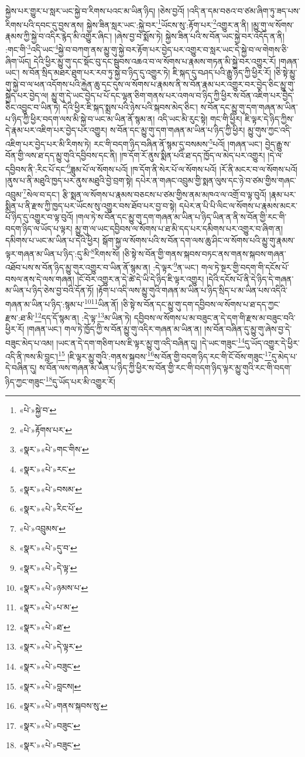 སྐྱེས་པར་གྱུར་པ་སླར་ཡང་སྐྱེ་བ་རིགས་པའང་མ་ཡིན་ཉིད། །ཅེས་བྱའོ། །འདི་ན་དམ་བཅའ་བ་ཙམ་ཞིག་ཏུ་ཟད་པས་རིགས་པའི་དབང་དུ་བྱས་ནས། སྐྱེས་ཟིན་སླར་ཡང་:སྐྱེ་བར་\footnote{«པེ་»སྐྱེ་བ་}ཡོངས་སུ་:རྟོག་པར་\footnote{«པེ་»རྟོགས་པར་}འགྱུར་ན་ནི། །མྱུ་གུ་ལ་སོགས་རྣམས་ཀྱི་སྐྱེ་བ་འདིར་རྙེད་མི་འགྱུར་ཞིང་། །ཞེས་བྱ་བ་སྨོས་ཏེ། སྐྱེས་ཟིན་པའི་ས་བོན་ཡང་སྐྱེ་བར་འདོད་ན་ནི། :གང་གི་\footnote{«སྣར་»«པེ་»གང་གིས་}འདི་ཡང་\footnote{«སྣར་»«པེ་»རང་}སྐྱེ་བ་བཀག་ནས་མྱུ་གུ་སྐྱེ་བར་རྟོག་པར་བྱེད་པར་འགྱུར་བ་སླར་ཡང་དེ་སྐྱེ་བ་ལ་གེགས་ཅི་ཞིག་ཡོད། དེའི་ཕྱིར་མྱུ་གུ་དང་སྡོང་བུ་དང་སྦུབས་འཆའ་བ་ལ་སོགས་པ་རྣམས་གཏན་མི་སྐྱེ་བར་འགྱུར་རོ། །གཞན་ཡང་། ས་བོན་སྲིད་མཐར་ཐུག་པར་རབ་ཏུ་སྐྱེ་བ་ཉིད་དུ་འགྱུར་ཏེ། ཇི་སྐད་དུ་བཤད་པའི་རྒྱུ་ཉིད་ཀྱི་ཕྱིར་རོ། །ཅི་སྟེ་མྱུ་གུ་སྐྱེ་བ་ལ་ཕན་འདོགས་པའི་རྐྱེན་ཆུ་དང་དུས་ལ་སོགས་པ་རྣམས་ནི་ས་བོན་རྣམ་པར་འགྱུར་བར་བྱེད་ཅིང་མྱུ་གུ་སྐྱེད་པར་བྱེད་ལ། མྱུ་གུ་དེ་ཡང་བྱེད་པ་པོ་དང་ལྷན་ཅིག་གནས་པར་འགལ་བ་ཉིད་ཀྱི་ཕྱིར་ས་བོན་འཇིག་པར་བྱེད་ཅིང་འབྱུང་བ་ཡིན་ཏེ། དེའི་ཕྱིར་ཇི་སྐད་སྨྲས་པའི་ཉེས་པའི་སྐབས་མེད་ཅིང་། ས་བོན་དང་མྱུ་གུ་དག་གཞན་མ་ཡིན་པ་ཉིད་ཀྱི་ཕྱིར་བདག་ལས་མི་སྐྱེ་བ་ཡང་མ་ཡིན་ནོ་སྙམ་ན། འདི་ཡང་མི་རུང་སྟེ། གང་གི་ཕྱིར། ཇི་ལྟར་དེ་ཉིད་ཀྱིས་དེ་རྣམ་པར་འཇིག་པར་བྱེད་པར་འགྱུར། ས་བོན་དང་མྱུ་གུ་དག་གཞན་མ་ཡིན་པ་ཉིད་ཀྱི་ཕྱིར། མྱུ་གུས་ཀྱང་འདི་འཇིག་པར་བྱེད་པར་མི་རིགས་ཏེ། རང་གི་བདག་ཉིད་བཞིན་ནོ་སྙམ་དུ་བསམས་\footnote{«སྣར་»«པེ་»བསམ་}པའོ། །གཞན་ཡང་། བྱེད་རྒྱུ་ས་བོན་གྱི་ལས་ཐ་དད་མྱུ་གུའི་དབྱིབས་དང་ནི། །ཁ་དོག་རོ་ནུས་སྨིན་པའི་ཐ་དད་ཁྱོད་ལ་མེད་པར་འགྱུར། །དེ་ལ་དབྱིབས་ནི་:རིང་པོ་དང་\footnote{«སྣར་»«པེ་»རིང་པོ་}ཟླུམ་པོ་ལ་སོགས་པའོ། །ཁ་དོག་ནི་སེར་པོ་ལ་སོགས་པའོ། །རོ་ནི་མངར་བ་ལ་སོགས་པའོ། །ནུས་པ་ནི་མཐུའི་ཁྱད་པར་ནུས་མཐུའི་བྱེ་བྲག་སྟེ། དཔེར་ན་གཞང་འབྲུམ་གྱི་སྨན་ལུས་དང་ཉེ་བ་ཙམ་གྱིས་གཞང་འབྲུམ་\footnote{«པེ་»འབྲུམས་}སེལ་བ་དང་། རྩི་སྨན་ལ་སོགས་པ་རྣམས་བཅངས་པ་ཙམ་གྱིས་ནམ་མཁའ་ལ་འགྲོ་བ་ལྟ་བུའོ། །རྣམ་པར་སྨིན་པ་ནི་རྫས་ཀྱི་ཁྱད་པར་ཡོངས་སུ་འགྱུར་བས་ཐོབ་པར་བྱ་བ་སྟེ། དཔེར་ན་པི་པི་ལིང་ལ་སོགས་པ་རྣམས་མངར་པོ་ཉིད་དུ་འགྱུར་བ་ལྟ་བུའོ། །གལ་ཏེ་ས་བོན་དང་མྱུ་གུ་དག་གཞན་མ་ཡིན་པ་ཉིད་ཡིན་ན་ནི་ས་བོན་གྱི་རང་གི་བདག་ཉིད་ལ་ཡོད་པ་ལྟར། མྱུ་གུ་ལ་ཡང་དབྱིབས་ལ་སོགས་པ་ཐ་མི་དད་པར་དམིགས་པར་འགྱུར་བ་ཞིག་ན། དམིགས་པ་ཡང་མ་ཡིན་པ་དེའི་ཕྱིར། སྒོག་སྐྱ་ལ་སོགས་པའི་ས་བོན་དག་ལས་ཆུ་ཤིང་ལ་སོགས་པའི་མྱུ་གུ་རྣམས་ལྟར་གཞན་མ་ཡིན་པ་ཉིད་:དུ་མི་\footnote{«སྣར་»«པེ་»དུ་བ་}རིགས་སོ། །ཅི་སྟེ་ས་བོན་གྱི་གནས་སྐབས་བཏང་ནས་གནས་སྐབས་གཞན་འཐོབ་པས་ས་བོན་ཉིད་མྱུ་གུར་འགྱུར་བ་ཡིན་ནོ་སྙམ་ན། :དེ་ལྟར་\footnote{«སྣར་»«པེ་»དེ་ལྟ་}ན་ཡང་། གལ་ཏེ་སྔར་གྱི་བདག་གི་དངོས་པོ་བསལ་ནས་དེ་ལས་གཞན། །ངོ་བོར་འགྱུར་ན་དེ་ཚེ་དེ་ཡི་དེ་ཉིད་ཇི་ལྟར་འགྱུར། །དེའི་དངོས་པོ་ནི་དེ་ཉིད་དེ་གཞན་མ་ཡིན་པ་ཉིད་ཅེས་བྱ་བའི་དོན་ཏོ། །རྟོག་པ་འདི་ལས་མྱུ་གུའི་གཞན་མ་ཡིན་པ་ཉིད་སྲིད་པ་མ་ཡིན་པས་འདིའི་གཞན་མ་ཡིན་པ་ཉིད་:སྙམ་པ་\footnote{«སྣར་»«པེ་»ཉམས་པ་}\footnote{«སྣར་»«པེ་»པ་མ་}ཡིན་ནོ། །ཅི་སྟེ་ས་བོན་དང་མྱུ་གུ་དག་དབྱིབས་ལ་སོགས་པ་ཐ་དད་ཀྱང་རྫས་:ཐ་མི་\footnote{«སྣར་»«པེ་»ཐ་}དད་དོ་སྙམ་ན། :དེ་ལྟ་\footnote{«སྣར་»«པེ་»དེ་ལྟར་}མ་ཡིན་ཏེ། དབྱིབས་ལ་སོགས་པ་མ་བཟུང་ན་དེ་དག་གི་རྫས་མ་བཟུང་བའི་ཕྱིར་རོ། །གཞན་ཡང་། གལ་ཏེ་ཁྱོད་ཀྱི་ས་བོན་མྱུ་གུ་འདིར་གཞན་མ་ཡིན་ན། །ས་བོན་བཞིན་དུ་མྱུ་གུ་ཞེས་བྱ་དེ་བཟུང་མེད་པ་འམ། །ཡང་ན་དེ་དག་གཅིག་པས་ཇི་ལྟར་མྱུ་གུ་འདི་བཞིན་དུ། །དེ་ཡང་གཟུང་\footnote{«སྣར་»«པེ་»བཟུང་}དུ་ཡོད་འགྱུར་དེ་ཕྱིར་འདི་ནི་ཁས་མི་བླང་།\footnote{«སྣར་»«པེ་»བླངས།} །ཇི་ལྟར་མྱུ་གུའི་:གནས་སྐབས་\footnote{«སྣར་»«པེ་»གནས་སྐབས་སུ་}ས་བོན་གྱི་བདག་ཉིད་རང་གི་ངོ་བོས་གཟུང་\footnote{«སྣར་»«པེ་»བཟུང་}དུ་མེད་པ་དེ་བཞིན་དུ། ས་བོན་ལས་གཞན་མ་ཡིན་པ་ཉིད་ཀྱི་ཕྱིར་ས་བོན་གྱི་རང་གི་བདག་ཉིད་ལྟར་མྱུ་གུའི་རང་གི་བདག་ཉིད་ཀྱང་གཟུང་\footnote{«སྣར་»«པེ་»བཟུང་}དུ་ཡོད་པར་མི་འགྱུར་རོ། 